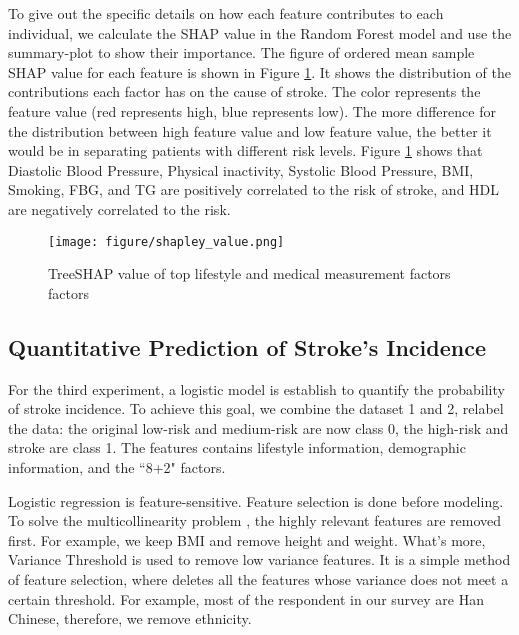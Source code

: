 \documentclass{article}
\begin{document}
To give out the specific details on how each feature contributes to each individual, we calculate the SHAP value in the Random Forest model and use the summary-plot to show their importance. The figure of ordered mean sample SHAP value for each feature is shown in Figure \ref{fig:shap_value}. It shows the distribution of the contributions each factor has on the cause of stroke. The color represents the feature value (red  represents  high, blue  represents  low). The more difference for the distribution between high feature value and low feature value, the better it would be in separating patients with different risk levels.  Figure \ref{fig:shap_value} shows that Diastolic Blood Pressure, Physical inactivity, Systolic Blood Pressure, BMI, Smoking, FBG, and TG are positively correlated to the risk of stroke, and HDL are negatively correlated to the risk. 
\begin{figure}[H]
    \centering
    \texttt{[image: figure/shapley\_value.png]}
    \caption{TreeSHAP value of top lifestyle and medical measurement factors factors}
    \label{fig:shap_value}
\end{figure}

\subsection{Quantitative Prediction of Stroke's Incidence}
For the third experiment, 
a logistic model is 
 establish to  quantify the probability of stroke incidence.  To achieve this goal, we combine the dataset 1 and 2,  relabel the data: the original low-risk and medium-risk are now class 0, the high-risk and stroke are class 1. The features contains lifestyle information, demographic information, and the ``8+2" factors.

 Logistic regression is feature-sensitive.  Feature selection is done before modeling. To solve the multicollinearity problem \cite{alin2010multicollinearity},   the highly relevant features are removed first. For example, we keep BMI and remove height and weight. What's more,   Variance Threshold \cite{guyon2003introduction} is used to remove low variance features. It is a simple method of feature selection, where deletes all the features whose variance does not meet a certain threshold. For example, most of the respondent in our survey are Han Chinese, therefore, we remove ethnicity.
 
\end{document}
